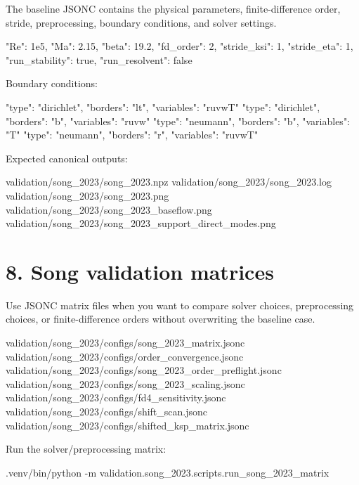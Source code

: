 \documentclass[11pt,a4paper]{article}
\begin{document}
The baseline JSONC contains the physical parameters, finite-difference order, stride, preprocessing, boundary conditions, and solver settings.

\begin{snippetbox}
"Re": 1e5,
"Ma": 2.15,
"beta": 19.2,
"fd_order": 2,
"stride_ksi": 1,
"stride_eta": 1,
"run_stability": true,
"run_resolvent": false
\end{snippetbox}

Boundary conditions:

\begin{snippetbox}
{"type": "dirichlet", "borders": "lt", "variables": "ruvwT"}
{"type": "dirichlet", "borders": "b",  "variables": "ruvw"}
{"type": "neumann",   "borders": "b",  "variables": "T"}
{"type": "neumann",   "borders": "r",  "variables": "ruvwT"}
\end{snippetbox}

Expected canonical outputs:

\begin{outputbox}
validation/song_2023/song_2023.npz
validation/song_2023/song_2023.log
validation/song_2023/song_2023.png
validation/song_2023/song_2023_baseflow.png
validation/song_2023/song_2023_support_direct_modes.png
\end{outputbox}

\section*{8. Song validation matrices}

Use JSONC matrix files when you want to compare solver choices, preprocessing choices, or finite-difference orders without overwriting the baseline case.

\begin{outputbox}
validation/song_2023/configs/song_2023_matrix.jsonc
validation/song_2023/configs/order_convergence.jsonc
validation/song_2023/configs/song_2023_order_preflight.jsonc
validation/song_2023/configs/song_2023_scaling.jsonc
validation/song_2023/configs/fd4_sensitivity.jsonc
validation/song_2023/configs/shift_scan.jsonc
validation/song_2023/configs/shifted_ksp_matrix.jsonc
\end{outputbox}

Run the solver/preprocessing matrix:

\begin{commandbox}
.venv/bin/python -m validation.song_2023.scripts.run_song_2023_matrix
\end{commandbox}
\end{document}
